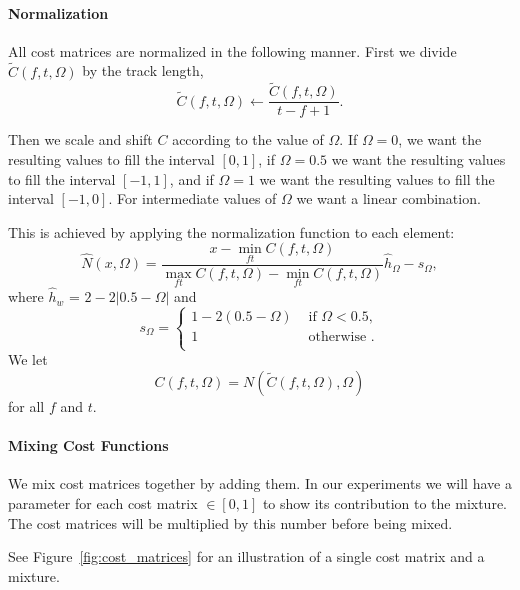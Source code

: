 \documentclass[twocolumn]{article}
\begin{document}
	\paragraph{Normalization}

All cost matrices are normalized in the following manner. First we
divide $\tilde C(f,t,\Omega)$ by the track length,
$$
\tilde C(f,t,\Omega)\leftarrow \frac{\tilde C(f,t,\Omega)}{t-f+1}.
$$ 

Then we scale and shift $C$ according to the value of $\Omega$. If
$\Omega=0$, we want the resulting values to fill the interval $[0,1]$,
if $\Omega=0.5$ we want the resulting values to fill the interval $[-1,1]$,
and if $\Omega=1$ we want the resulting values to fill the interval $[-1,0]$.
For intermediate values of $\Omega$ we want a linear combination.

This is achieved by applying the normalization function to each element:
	\begin{dmath*}
		\hat N(x,\Omega) = \frac{ x - \min_{ft}C(f,t,\Omega) }{ \max_{ft} C(f,t,\Omega) - \min_{ft} C(f,t,\Omega)} \hat h_\Omega -s_\Omega,
	\end{dmath*}
where $\hat h_w$ = $2-2|0.5-\Omega|$ and
	\begin{dmath*}
		s_\Omega= { \left\{
			\begin{array}{ll}
				1-2(0.5-\Omega) & \mbox{~if~}\Omega < 0.5,   \\
				1 & \mbox{~otherwise~}.  \\
			\end{array}
			\right.}
\end{dmath*}
We let
\begin{dmath*}
C(f,t,\Omega)=N(\tilde C(f,t,\Omega),\Omega)
\end{dmath*}
for all $f$ and $t$.

	
	
	
	\paragraph{Mixing Cost Functions}
	
	We mix cost matrices together by adding them. In our experiments we will have a parameter for each cost matrix $\in [0,1]$ to show its contribution to the mixture. The cost matrices will be multiplied by this number before being mixed. 
	
	See Figure~\ref{fig:cost_matrices} for an illustration of a single cost matrix and a mixture. 
\end{document}
